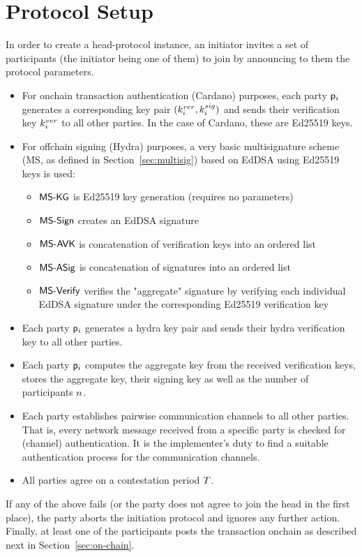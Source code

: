 
\section{Protocol Setup}\label{sec:setup}
In order to create a head-protocol instance, an initiator invites a set of
participants (the initiator being one of them) to join by announcing to them the
protocol parameters.

\begin{itemize}
  \item For onchain transaction authentication (Cardano) purposes, each party $\mathsf p_i$ generates a
        corresponding key pair $(k^{ver}_{i},k^{sig}_{i})$ and sends their verification key $k^{ver}_{i}$ to all other parties. In the case of Cardano, these are Ed25519 keys.

  \item For offchain signing (Hydra) purposes, a very basic multisignature scheme (MS, as defined in Section~\ref{sec:multisig}) based on EdDSA using Ed25519 keys is used:
        \begin{itemize}
          \item $\mathsf{MS\textsf{-}{}KG}$ is Ed25519 key generation (requires no parameters)
          \item $\mathsf{MS\textsf{-}{}Sign}$ creates an EdDSA signature
          \item $\mathsf{MS\textsf{-}{}AVK}$ is concatenation of verification keys into an ordered list
          \item $\mathsf{MS\textsf{-}{}ASig}$ is concatenation of signatures into an ordered list
          \item $\mathsf{MS\textsf{-}{}Verify}$ verifies the "aggregate" signature by verifying each individual EdDSA signature under the corresponding Ed25519 verification key
        \end{itemize}
        
  \item Each party $\mathsf p_i$ generates a hydra key pair and sends their hydra verification key to all other parties.

  \item Each party $\mathsf p_i$ computes the aggregate key from the received verification keys, stores the aggregate key,
        their signing key as well as the number of participants $n$.
        
  \item Each party establishes pairwise communication channels to all other parties. That is, every network message received from a specific party is checked for (channel) authentication. It is the implementer’s duty to find a suitable authentication process for the communication channels.
  
  \item All parties agree on a contestation period $T$.
\end{itemize}

If any of the above fails (or the party does not agree to join the head in the
first place), the party aborts the initiation protocol and ignores any further
action. Finally, at least one of the participants posts the \mtxInit{} transaction
onchain as described next in Section~\ref{sec:on-chain}.

